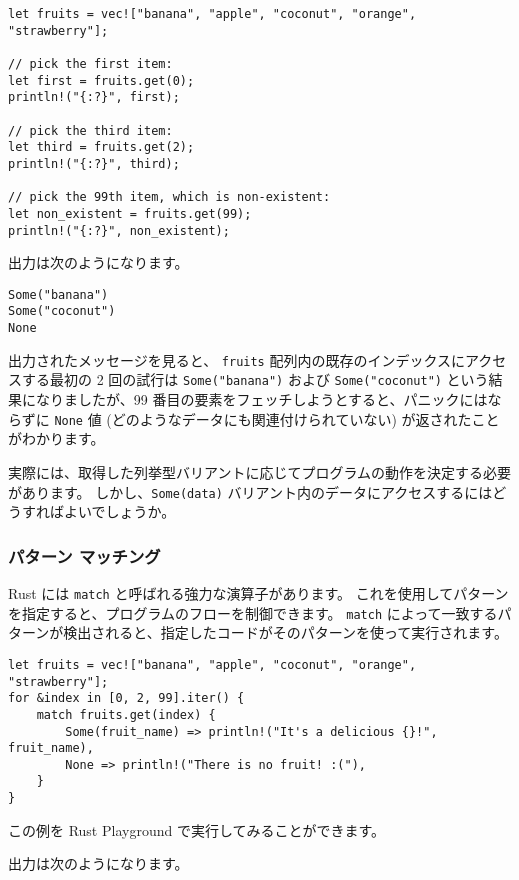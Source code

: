 \begin{lstlisting}[numbers=none]
let fruits = vec!["banana", "apple", "coconut", "orange", "strawberry"];

// pick the first item:
let first = fruits.get(0);
println!("{:?}", first);

// pick the third item:
let third = fruits.get(2);
println!("{:?}", third);

// pick the 99th item, which is non-existent:
let non_existent = fruits.get(99);
println!("{:?}", non_existent);
\end{lstlisting}

出力は次のようになります。

\begin{lstlisting}[numbers=none]
Some("banana")
Some("coconut")
None
\end{lstlisting}

出力されたメッセージを見ると、 \texttt{fruits} 配列内の既存のインデックスにアクセスする最初の 2 回の試行は \texttt{Some("banana")} および \texttt{Some("coconut")} という結果になりましたが、99 番目の要素をフェッチしようとすると、パニックにはならずに \texttt{None} 値 (どのようなデータにも関連付けられていない) が返されたことがわかります。

実際には、取得した列挙型バリアントに応じてプログラムの動作を決定する必要があります。 しかし、\texttt{Some(data)} バリアント内のデータにアクセスするにはどうすればよいでしょうか。

\subsubsection{パターン マッチング}

Rust には \texttt{match} と呼ばれる強力な演算子があります。 これを使用してパターンを指定すると、プログラムのフローを制御できます。 \texttt{match} によって一致するパターンが検出されると、指定したコードがそのパターンを使って実行されます。


\begin{lstlisting}[numbers=none]
let fruits = vec!["banana", "apple", "coconut", "orange", "strawberry"];
for &index in [0, 2, 99].iter() {
    match fruits.get(index) {
        Some(fruit_name) => println!("It's a delicious {}!", fruit_name),
        None => println!("There is no fruit! :("),
    }
}
\end{lstlisting}

この例を Rust Playground で実行してみることができます。

出力は次のようになります。

